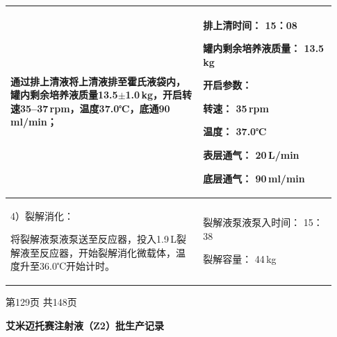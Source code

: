 \documentclass[UTF8,10pt,a4paper,fontset=fandol]{ctexart}
\newcommand{\fieldvalue}[1]{#1}
\newcommand{\handwritten}[1]{#1}
\begin{document}
\begin{tabular}{|p{0.55\linewidth}|p{0.38\linewidth}|}
\begin{minipage}[t]{0.53\linewidth}
通过排上清液将上清液排至霍氏液袋内，罐内剩余培养液质量13.5$\pm$1.0\,kg，开启转速35--37\,rpm，温度37.0℃，底通90\,ml/min；
\end{minipage}
&
\begin{minipage}[t]{0.36\linewidth}
排上清时间：
\fieldvalue{\handwritten{15：08}}

罐内剩余培养液质量：
\fieldvalue{\handwritten{13.5}}\,kg

开启参数：

转速：
\fieldvalue{\handwritten{35}}\,rpm

温度：
\fieldvalue{\handwritten{37.0}}℃

表层通气：
\fieldvalue{\handwritten{20}}\,L/min

底层通气：
\fieldvalue{\handwritten{90}}\,ml/min
\end{minipage}
\\
\hline
\begin{minipage}[t]{0.53\linewidth}
4）裂解消化：

将裂解液泵液泵送至反应器，投入1.9\,L裂解液至反应器，开始裂解消化微载体，温度升至36.0℃开始计时。
\end{minipage}
&
\begin{minipage}[t]{0.36\linewidth}
裂解液泵液泵入时间：
\fieldvalue{\handwritten{15：38}}

裂解容量：
\fieldvalue{\handwritten{44}}\,kg
\end{minipage}
\\
\hline
\end{tabular}

\vfill
\begin{center}
\scriptsize 第129页 共148页
\end{center}

\newpage

\begin{center}
\textbf{艾米迈托赛注射液（Z2）批生产记录}
\end{center}
\end{document}
